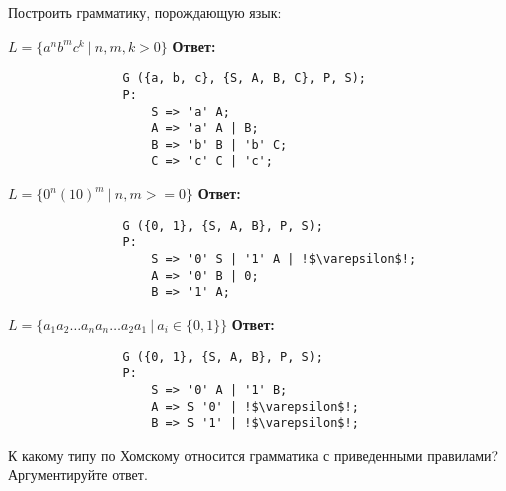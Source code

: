 \documentclass[]{article}
\begin{document}
\begin{enumerate}
\begin{item}
\begin{enumerate}
    \end{enumerate}
\end{item}

\begin{item}
    Построить грамматику, порождающую язык:
    \begin{enumerate}
    
        \begin{item}
            $L = \{ a^n b^m c^k\ |\  n, m, k > 0 \}$
            \bigbreak
            \textbf{Ответ:}
            \begin{lstlisting}
                G ({a, b, c}, {S, A, B, C}, P, S);
                P:
                    S => 'a' A;
                    A => 'a' A | B;
                    B => 'b' B | 'b' C;
                    C => 'c' C | 'c';
            \end{lstlisting}
        \end{item}

        \begin{item}
            $L = \{ 0^n (10)^m \ |\  n, m >= 0 \}$
            \bigbreak
            \textbf{Ответ:}
            \begin{lstlisting}
                G ({0, 1}, {S, A, B}, P, S);
                P:
                    S => '0' S | '1' A | !$\varepsilon$!;
                    A => '0' B | 0;
                    B => '1' A;
            \end{lstlisting}
        \end{item}

        \begin{item}
            $L = \{ a_1 a_2 \dots a_n a_n \dots a_2 a_1 \ |\  a_i \in \{ 0, 1 \} \}$
            \bigbreak
            \textbf{Ответ:}
            \begin{lstlisting}
                G ({0, 1}, {S, A, B}, P, S);
                P:
                    S => '0' A | '1' B;
                    A => S '0' | !$\varepsilon$!;
                    B => S '1' | !$\varepsilon$!;
            \end{lstlisting}
        \end{item}
    
    \end{enumerate}
\end{item}

\begin{item}
    К какому типу по Хомскому относится грамматика с приведенными правилами? Аргументируйте ответ.
    \begin{enumerate}
        

\end{enumerate}
\end{item}
\end{enumerate}
\end{document}
